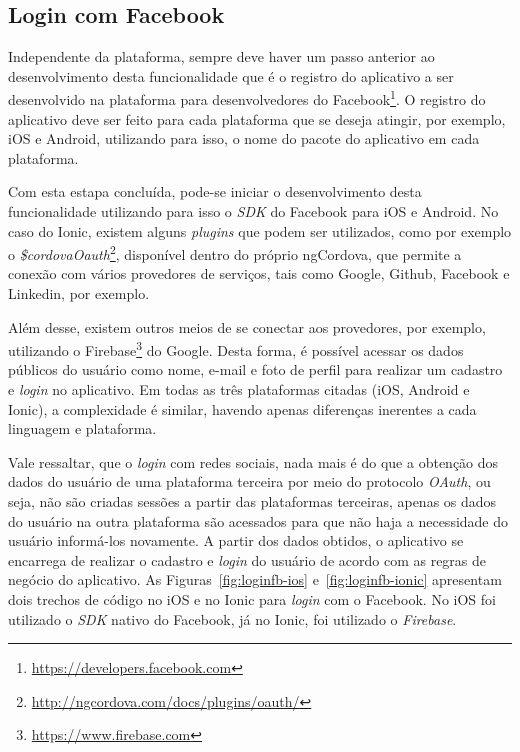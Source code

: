 \subsection{Login com Facebook} \label{subsec:loginfb}
Independente da plataforma, sempre deve haver um passo anterior ao desenvolvimento desta funcionalidade que é o registro do 
aplicativo a ser desenvolvido na plataforma para desenvolvedores do Facebook\footnote{\url{https://developers.facebook.com}}. O registro do aplicativo deve ser feito
para cada plataforma que se deseja atingir, por exemplo, iOS e Android, utilizando para isso, o nome do pacote do aplicativo em cada plataforma. 

Com esta estapa concluída, pode-se iniciar o desenvolvimento desta funcionalidade utilizando para isso o \textit{SDK} do Facebook para iOS e Android.
No caso do Ionic, existem alguns \textit{plugins} que podem ser utilizados, como por exemplo o \textit{\$cordovaOauth}\footnote{\url{http://ngcordova.com/docs/plugins/oauth/}}, disponível dentro do próprio ngCordova, 
que permite a conexão com vários provedores de serviços, tais como Google, Github, Facebook e Linkedin, por exemplo. 

Além desse, existem outros meios de se conectar aos provedores, por exemplo, utilizando o 
Firebase\footnote{\url{https://www.firebase.com}} do Google. Desta forma, é possível acessar os dados públicos do usuário como nome, e-mail e foto de perfil para realizar um cadastro e \textit{login} no aplicativo.
Em todas as três plataformas citadas (iOS, Android e Ionic), a complexidade é similar, havendo apenas diferenças inerentes a cada linguagem e plataforma. 

Vale ressaltar, que o \textit{login} com redes sociais, nada mais é do que a obtenção dos dados do usuário de uma plataforma terceira por meio do protocolo \textit{OAuth}, 
ou seja, não são criadas sessões a partir das plataformas terceiras, apenas os dados do usuário na outra plataforma são acessados para que não haja a necessidade do usuário informá-los novamente. A partir dos dados 
obtidos, o aplicativo se encarrega de realizar o cadastro e \textit{login} do usuário de acordo com as regras de negócio do aplicativo. 
As Figuras~\ref{fig:loginfb-ios} e~\ref{fig:loginfb-ionic} apresentam dois trechos de código no iOS e no Ionic para \textit{login} com o Facebook. No iOS foi utilizado o \textit{SDK} nativo do Facebook, 
já no Ionic, foi utilizado o \textit{Firebase}. 

